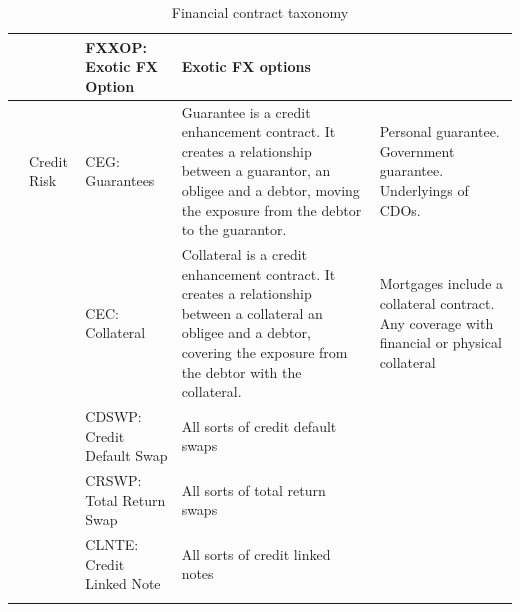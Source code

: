 \documentclass[9pt,oneside]{amsart}
\begin{document}
\begin{longtable}{| p{}p{}p{}p{}p{} |}
	\hline 
	 & & FXXOP: Exotic FX Option & Exotic FX options & \\
	\hline 
	 & Credit Risk & CEG: Guarantees & Guarantee is a credit enhancement contract. It creates a relationship between a guarantor, an obligee and a debtor, moving the exposure from the debtor to the guarantor. & Personal guarantee. Government guarantee. Underlyings of CDOs. \\
	\hline 
	 & & CEC: Collateral & Collateral is a credit enhancement contract. It creates a relationship between a collateral an obligee and a debtor, covering the exposure from the debtor with the collateral. & Mortgages include a collateral contract. Any coverage with financial or physical collateral \\
	\hline 
	 & & CDSWP: Credit Default Swap & All sorts of credit default swaps &  \\
	\hline 
	 & & CRSWP: Total Return Swap & All sorts of total return swaps & \\
	\hline 
	 & & CLNTE: Credit Linked Note & All sorts of credit linked notes & \\
	\hline
	\caption{Financial contract taxonomy}
	\label{tbl:taxonomy}
\end{longtable}
\end{document}
